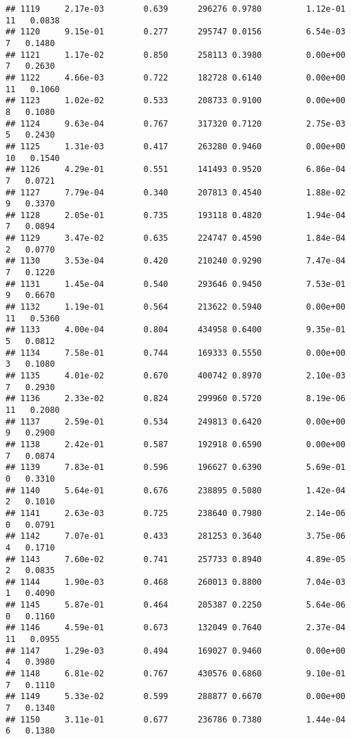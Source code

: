 \documentclass[
]{article}
\begin{document}
\begin{verbatim}
## 1119     2.17e-03        0.639      296276 0.9780         1.12e-01  11   0.0838
## 1120     9.15e-01        0.277      295747 0.0156         6.54e-03   7   0.1480
## 1121     1.17e-02        0.850      258113 0.3980         0.00e+00   7   0.2630
## 1122     4.66e-03        0.722      182728 0.6140         0.00e+00  11   0.1060
## 1123     1.02e-02        0.533      208733 0.9100         0.00e+00   8   0.1080
## 1124     9.63e-04        0.767      317320 0.7120         2.75e-03   5   0.2430
## 1125     1.31e-03        0.417      263280 0.9460         0.00e+00  10   0.1540
## 1126     4.29e-01        0.551      141493 0.9520         6.86e-04   7   0.0721
## 1127     7.79e-04        0.340      207813 0.4540         1.88e-02   9   0.3370
## 1128     2.05e-01        0.735      193118 0.4820         1.94e-04   7   0.0894
## 1129     3.47e-02        0.635      224747 0.4590         1.84e-04   2   0.0770
## 1130     3.53e-04        0.420      210240 0.9290         7.47e-04   7   0.1220
## 1131     1.45e-04        0.540      293646 0.9450         7.53e-01   9   0.6670
## 1132     1.19e-01        0.564      213622 0.5940         0.00e+00  11   0.5360
## 1133     4.00e-04        0.804      434958 0.6400         9.35e-01   5   0.0812
## 1134     7.58e-01        0.744      169333 0.5550         0.00e+00   3   0.1080
## 1135     4.01e-02        0.670      400742 0.8970         2.10e-03   7   0.2930
## 1136     2.33e-02        0.824      299960 0.5720         8.19e-06  11   0.2080
## 1137     2.59e-01        0.534      249813 0.6420         0.00e+00   9   0.2900
## 1138     2.42e-01        0.587      192918 0.6590         0.00e+00   7   0.0874
## 1139     7.83e-01        0.596      196627 0.6390         5.69e-01   0   0.3310
## 1140     5.64e-01        0.676      238895 0.5080         1.42e-04   2   0.1010
## 1141     2.63e-03        0.725      238640 0.7980         2.14e-06   0   0.0791
## 1142     7.07e-01        0.433      281253 0.3640         3.75e-06   4   0.1710
## 1143     7.60e-02        0.741      257733 0.8940         4.89e-05   2   0.0835
## 1144     1.90e-03        0.468      260013 0.8800         7.04e-03   1   0.4090
## 1145     5.87e-01        0.464      205387 0.2250         5.64e-06   0   0.1160
## 1146     4.59e-01        0.673      132049 0.7640         2.37e-04  11   0.0955
## 1147     1.29e-03        0.494      169027 0.9460         0.00e+00   4   0.3980
## 1148     6.81e-02        0.767      430576 0.6860         9.10e-01   7   0.1110
## 1149     5.33e-02        0.599      288877 0.6670         0.00e+00   7   0.1340
## 1150     3.11e-01        0.677      236786 0.7380         1.44e-04   6   0.1380

\end{verbatim}
\end{document}

